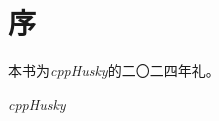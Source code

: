 \chapter{序}
本书为\textit{cppHusky}的二〇二四年礼。\par

\begin{flushright}
\textit{cppHusky}\par
\end{flushright}